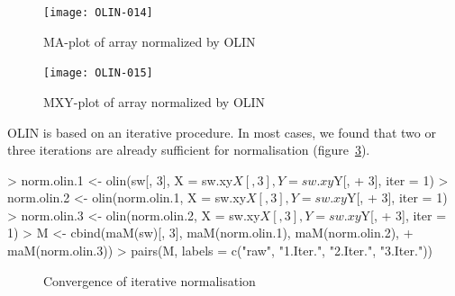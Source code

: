 \documentclass[a4paper,11pt]{article}
\begin{document}

\begin{figure}[t]
\centering
\texttt{[image: OLIN-014]}
\caption{MA-plot of array normalized by  OLIN }
\label{maolin}
\end{figure}



\begin{figure}
\centering
\texttt{[image: OLIN-015]}
\caption{MXY-plot of array normalized by  OLIN }
\label{mxyolin}
\end{figure}


OLIN is based on an iterative procedure. In most cases, we found
that two or three iterations are already sufficient for normalisation (figure~\ref{iter}).   


\begin{Schunk}
\begin{Sinput}
> norm.olin.1 <- olin(sw[, 3], X = sw.xy$X[, 3], Y = sw.xy$Y[, 
+     3], iter = 1)
> norm.olin.2 <- olin(norm.olin.1, X = sw.xy$X[, 3], Y = sw.xy$Y[, 
+     3], iter = 1)
> norm.olin.3 <- olin(norm.olin.2, X = sw.xy$X[, 3], Y = sw.xy$Y[, 
+     3], iter = 1)
> M <- cbind(maM(sw)[, 3], maM(norm.olin.1), maM(norm.olin.2), 
+     maM(norm.olin.3))
> pairs(M, labels = c("raw", "1.Iter.", "2.Iter.", "3.Iter."))
\end{Sinput}
\end{Schunk}


\begin{figure}[t]
\centering
{}
\caption{Convergence of iterative normalisation }
\label{iter}
\end{figure}
\end{document}
